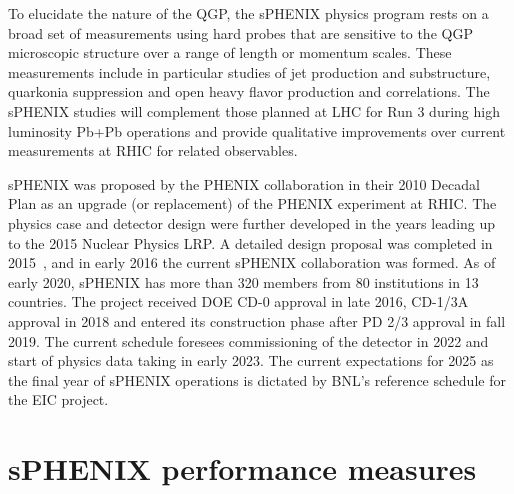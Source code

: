 To elucidate the nature of the QGP, the sPHENIX physics program rests on a broad set of measurements using hard probes that are sensitive to the QGP microscopic structure over a range of length or momentum scales. These measurements include in particular studies of jet production and substructure, quarkonia suppression and open heavy flavor production and correlations. The sPHENIX studies will complement those planned at LHC for Run 3 during high luminosity Pb+Pb operations and provide qualitative improvements over current measurements at RHIC for related observables.

sPHENIX was proposed by the PHENIX collaboration in their 2010 Decadal Plan as an upgrade (or replacement) of the PHENIX experiment at RHIC. The physics case and detector design were further developed in the years leading up to the 2015 Nuclear Physics LRP. A detailed design proposal was completed in 2015~\cite{sPHENIX:2015irh}, and in early 2016 the current sPHENIX collaboration was formed. As of early 2020, sPHENIX has more than 320 members from 80 institutions in 13 countries. The project received DOE CD-0 approval in late 2016, CD-1/3A approval in 2018 and entered its construction phase after PD 2/3 approval in fall 2019. The current schedule foresees commissioning of the detector in 2022 and start of physics data taking in early 2023. The current expectations for 2025 as the final year of sPHENIX operations is dictated by BNL's reference schedule for the EIC project.

\section{sPHENIX performance measures}

